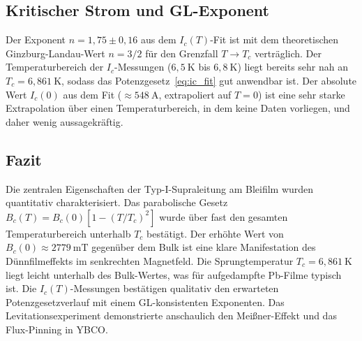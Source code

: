 \subsection{Kritischer Strom und GL-Exponent}

Der Exponent $n = 1{,}75 \pm 0{,}16$ aus dem $I_c(T)$-Fit ist mit dem theoretischen Ginzburg-Landau-Wert $n = 3/2$ für den Grenzfall $T \to T_c$ verträglich.
Der Temperaturbereich der $I_c$-Messungen ($6{,}5~\mathrm{K}$ bis $6{,}8~\mathrm{K}$) liegt bereits sehr nah an $T_c = 6{,}861~\mathrm{K}$, sodass das Potenzgesetz~\eqref{eq:ic_fit} gut anwendbar ist.
Der absolute Wert $I_c(0)$ aus dem Fit ($\approx 548~\mathrm{A}$, extrapoliert auf $T = 0$) ist eine sehr starke Extrapolation über einen Temperaturbereich, in dem keine Daten vorliegen, und daher wenig aussagekräftig.

\subsection{Fazit}

Die zentralen Eigenschaften der Typ-I-Supraleitung am Bleifilm wurden quantitativ charakterisiert.
Das parabolische Gesetz $B_c(T) = B_c(0)[1-(T/T_c)^2]$ wurde über fast den gesamten Temperaturbereich unterhalb $T_c$ bestätigt.
Der erhöhte Wert von $B_c(0) \approx 2779~\mathrm{mT}$ gegenüber dem Bulk ist eine klare Manifestation des Dünnfilmeffekts im senkrechten Magnetfeld.
Die Sprungtemperatur $T_c = 6{,}861~\mathrm{K}$ liegt leicht unterhalb des Bulk-Wertes, was für aufgedampfte Pb-Filme typisch ist.
Die $I_c(T)$-Messungen bestätigen qualitativ den erwarteten Potenzgesetzverlauf mit einem GL-konsistenten Exponenten.
Das Levitationsexperiment demonstrierte anschaulich den Meißner-Effekt und das Flux-Pinning in YBCO.
